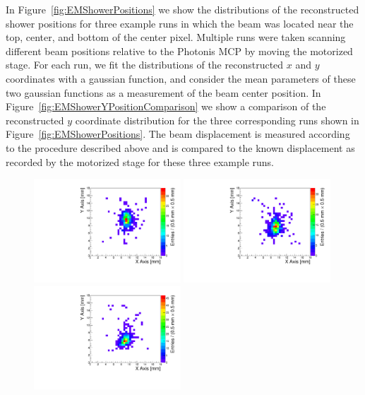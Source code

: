 \documentclass[12pt]{article}
\begin{document}
{In Figure~\ref{fig:EMShowerPositions} we show the distributions of the
reconstructed shower positions for three example runs in which the beam was
located near the top, center, and bottom of the center pixel. Multiple runs were
taken scanning different beam positions relative to the Photonis MCP by moving
the motorized stage. For each run, we fit the distributions of the reconstructed
$x$ and $y$ coordinates with a gaussian function, and consider the mean
parameters of these two gaussian functions as a measurement of the beam center
position. In Figure~\ref{fig:EMShowerYPositionComparison} we show a comparison
of the reconstructed $y$ coordinate distribution for the three corresponding
runs shown in Figure~\ref{fig:EMShowerPositions}. The beam displacement is
measured according to the procedure described above and is compared to the known
displacement as recorded by the motorized stage for these three example runs. 

\begin{figure}[htbp]
	\centering
	\includegraphics[width=0.49\textwidth]{Images/centers/run30dist.pdf}
	\includegraphics[width=0.49\textwidth]{Images/centers/run32dist.pdf}
	\includegraphics[width=0.49\textwidth]{Images/centers/run34dist.pdf}


\end{figure}}
\end{document}
